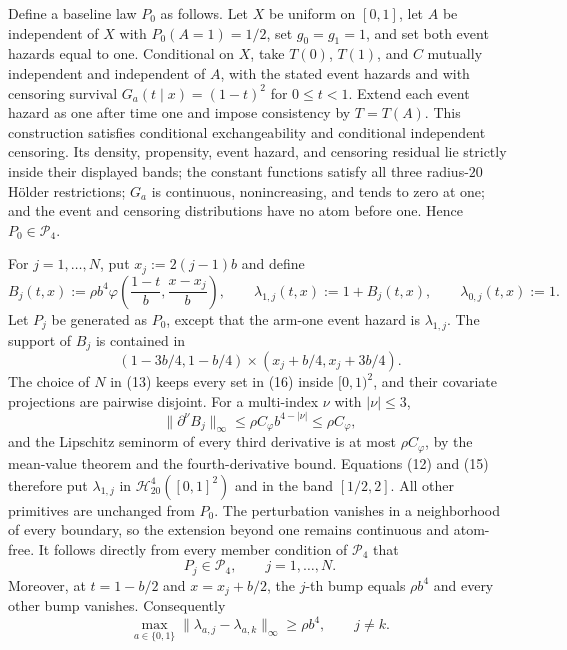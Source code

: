 Define a baseline law \(P_0\) as follows. Let \(X\) be uniform on \([0,1]\), let \(A\) be independent of \(X\) with \(P_0(A=1)=1/2\), set \(g_0=g_1=1\), and set both event hazards equal to one. Conditional on \(X\), take \(T(0)\), \(T(1)\), and \(C\) mutually independent and independent of \(A\), with the stated event hazards and with censoring survival \(G_a(t\mid x)=(1-t)^2\) for \(0\le t<1\). Extend each event hazard as one after time one and impose consistency by \(T=T(A)\). This construction satisfies conditional exchangeability and conditional independent censoring. Its density, propensity, event hazard, and censoring residual lie strictly inside their displayed bands; the constant functions satisfy all three radius-\(20\) Hölder restrictions; \(G_a\) is continuous, nonincreasing, and tends to zero at one; and the event and censoring distributions have no atom before one. Hence \(P_0\in\mathcal P_4\).

For \(j=1,\ldots,N\), put \(x_j:=2(j-1)b\) and define
\[
B_j(t,x):=\rho b^4
\varphi\!\left(\frac{1-t}{b},\frac{x-x_j}{b}\right),
\qquad
\lambda_{1,j}(t,x):=1+B_j(t,x),
\qquad
\lambda_{0,j}(t,x):=1. \tag{15}
\]
Let \(P_j\) be generated as \(P_0\), except that the arm-one event hazard is \(\lambda_{1,j}\). The support of \(B_j\) is contained in
\[
(1-3b/4,1-b/4)\times(x_j+b/4,x_j+3b/4).
\tag{16}
\]
The choice of \(N\) in (13) keeps every set in (16) inside \([0,1)^2\), and their covariate projections are pairwise disjoint. For a multi-index \(\nu\) with \(|\nu|\le3\),
\[
\lVert\partial^\nu B_j\rVert_\infty
\le \rho C_\varphi b^{4-|\nu|}\le\rho C_\varphi,
\]
and the Lipschitz seminorm of every third derivative is at most \(\rho C_\varphi\), by the mean-value theorem and the fourth-derivative bound. Equations (12) and (15) therefore put \(\lambda_{1,j}\) in \(\mathcal H^4_{20}([0,1]^2)\) and in the band \([1/2,2]\). All other primitives are unchanged from \(P_0\). The perturbation vanishes in a neighborhood of every boundary, so the extension beyond one remains continuous and atom-free. It follows directly from every member condition of \(\mathcal P_4\) that
\[
P_j\in\mathcal P_4,\qquad j=1,\ldots,N. \tag{17}
\]
Moreover, at \(t=1-b/2\) and \(x=x_j+b/2\), the \(j\)-th bump equals \(\rho b^4\) and every other bump vanishes. Consequently
\[
\max_{a\in\{0,1\}}\lVert\lambda_{a,j}-\lambda_{a,k}\rVert_\infty
\ge\rho b^4,
\qquad j\ne k. \tag{18}
\]

